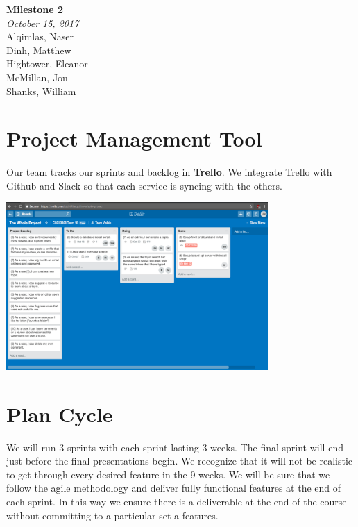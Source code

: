 \documentclass{article}
\begin{document}
  \begin{titlepage}
    \begin{center}
      \vspace{4cm}
      \textbf{\huge Milestone 2} \\
      \textit{October 15, 2017} \\
      \vspace{1cm}
      Alqimlas, Naser \\
      Dinh, Matthew \\
      Hightower, Eleanor \\
      McMillan, Jon \\
      Shanks, William \\
    \end{center}
  \end{titlepage}

  \section*{Project Management Tool}
  Our team tracks our sprints and backlog in \textbf{Trello}. We integrate
  Trello with Github and Slack so that each service is syncing with the others. 

  \begin{center}
    \includegraphics[width=10cm]{milestone_2_trello.png}
  \end{center}

  \section*{Plan Cycle}
  We will run 3 sprints with each sprint lasting 3 weeks. The final sprint will
  end just before the final presentations begin. We recognize that it will not
  be realistic to get through every desired feature in the 9 weeks. We will be
  sure that we follow the agile methodology and deliver fully functional
  features at the end of each sprint.  In this way we ensure there is a
  deliverable at the end of the course without committing to a particular set a
  features.
\end{document}
